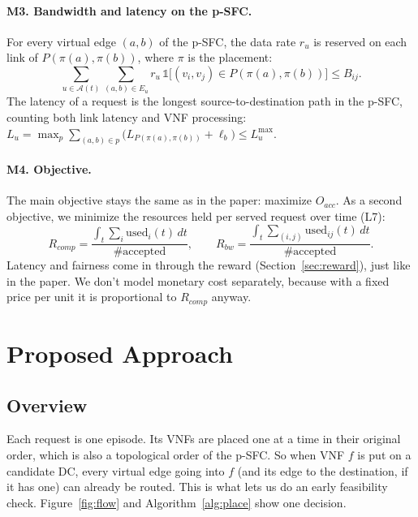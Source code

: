 \documentclass[11pt,a4paper]{article}
\begin{document}
\paragraph{M3. Bandwidth and latency on the p-SFC.} For every virtual edge
$(a,b)$ of the p-SFC, the data rate $r_u$ is reserved on each link of
$P(\pi(a),\pi(b))$, where $\pi$ is the placement:
\begin{equation}
\sum_{u\in\mathcal{A}(t)} \sum_{(a,b)\in E_u} r_u\,
\mathbb{1}\big[(v_i,v_j)\in P(\pi(a),\pi(b))\big] \le B_{ij}.
\end{equation}
The latency of a request is the longest source-to-destination path in the
p-SFC, counting both link latency and VNF processing:
$L_u = \max_{p} \sum_{(a,b)\in p} \big(L_{P(\pi(a),\pi(b))} + \ell_b\big)
\le L^{\max}_u$.

\paragraph{M4. Objective.} The main objective stays the same as in the paper:
maximize $O_{acc}$. As a second objective, we minimize the resources held per
served request over time (L7):
\begin{equation}
R_{comp} = \frac{\int_t \sum_i \mathrm{used}_i(t)\,dt}{\#\text{accepted}},
\qquad
R_{bw} = \frac{\int_t \sum_{(i,j)} \mathrm{used}_{ij}(t)\,dt}{\#\text{accepted}}.
\end{equation}
Latency and fairness come in through the reward (Section~\ref{sec:reward}), just
like in the paper. We don't model monetary cost separately, because with a fixed
price per unit it is proportional to $R_{comp}$ anyway.

\section{Proposed Approach}\label{sec:approach}

\subsection{Overview}
Each request is one episode. Its VNFs are placed one at a time in their original
order, which is also a topological order of the p-SFC. So when VNF $f$ is put on
a candidate DC, every virtual edge going into $f$ (and its edge to the
destination, if it has one) can already be routed. This is what lets us do an
early feasibility check. Figure~\ref{fig:flow} and Algorithm~\ref{alg:place}
show one decision.
\end{document}
